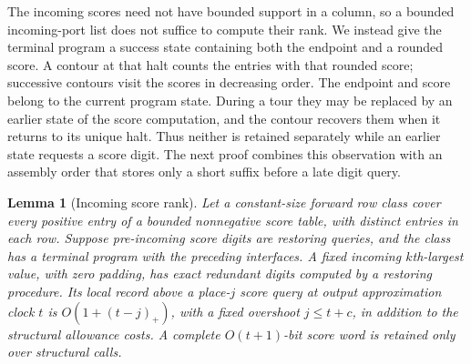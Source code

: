 \documentclass[11pt]{article}
\numberwithin{equation}{section}
\newtheorem{lemma}[theorem]{Lemma}
\theoremstyle{definition}
\theoremstyle{remark}
\begin{document}
The incoming scores need not have bounded support in a column, so a
bounded incoming-port list does not suffice to compute their rank.  We
instead give the terminal program a success state containing both the
endpoint and a rounded score.  A contour at that halt counts the
entries with that rounded score; successive contours visit the scores
in decreasing order.  The endpoint and score belong to the current
program state.  During a tour they may be replaced by an earlier state
of the score computation, and the contour recovers them when it returns
to its unique halt.  Thus neither is retained separately while an
earlier state requests a score digit.  The next proof combines this
observation with an assembly order that stores only a short suffix
before a late digit query.

\begin{lemma}[Incoming score rank]\label{lem:ctrl-score-rank}
Let a constant-size forward row class cover every positive entry of a
bounded nonnegative score table, with distinct entries in each row.
Suppose pre-incoming score digits are restoring queries, and the class
has a terminal program with the preceding interfaces.  A fixed incoming
$k$th-largest value, with zero padding, has exact redundant digits computed
by a restoring procedure.  Its local record above a place-$j$ score
query at output approximation clock $t$ is $O(1+(t-j)_+)$, with a fixed
overshoot $j\le t+c$, in addition to
the structural allowance costs.  A complete $O(t+1)$-bit score word is
retained only over structural calls.
\end{lemma}
\end{document}
